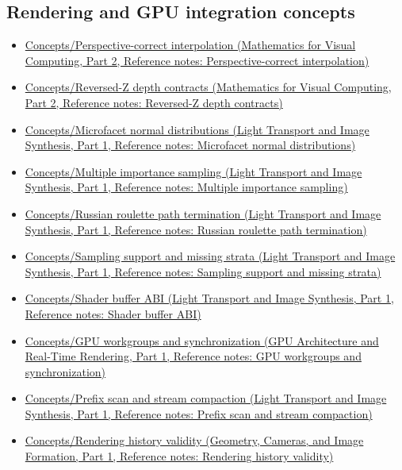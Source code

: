 \subsection{Rendering and GPU integration concepts}\label{appendix-a6d556a4ef50-rendering-and-gpu-integration-concepts}

\hypertarget{appendix-a6d556a4ef50-rendering-and-gpu-integration-concepts}{}

\begin{itemize}
\tightlist
\item
  \href{../02-Mathematics-for-Visual-Computing-P02/main.pdf\#nameddest=appendix-1ed5f96c73ea}{Concepts/Perspective-correct interpolation (Mathematics for Visual Computing, Part 2, Reference notes: Perspective-correct interpolation)}
\item
  \href{../02-Mathematics-for-Visual-Computing-P02/main.pdf\#nameddest=appendix-275ec8847057}{Concepts/Reversed-Z depth contracts (Mathematics for Visual Computing, Part 2, Reference notes: Reversed-Z depth contracts)}
\item
  \href{../04-Light-Transport-and-Image-Synthesis-P01/main.pdf\#nameddest=appendix-885c1cb64ae9}{Concepts/Microfacet normal distributions (Light Transport and Image Synthesis, Part 1, Reference notes: Microfacet normal distributions)}
\item
  \href{../04-Light-Transport-and-Image-Synthesis-P01/main.pdf\#nameddest=appendix-ca8898faf1a6}{Concepts/Multiple importance sampling (Light Transport and Image Synthesis, Part 1, Reference notes: Multiple importance sampling)}
\item
  \href{../04-Light-Transport-and-Image-Synthesis-P01/main.pdf\#nameddest=appendix-7277c62d4599}{Concepts/Russian roulette path termination (Light Transport and Image Synthesis, Part 1, Reference notes: Russian roulette path termination)}
\item
  \href{../04-Light-Transport-and-Image-Synthesis-P01/main.pdf\#nameddest=appendix-10308c3d753e}{Concepts/Sampling support and missing strata (Light Transport and Image Synthesis, Part 1, Reference notes: Sampling support and missing strata)}
\item
  \href{../04-Light-Transport-and-Image-Synthesis-P01/main.pdf\#nameddest=appendix-749048795dbb}{Concepts/Shader buffer ABI (Light Transport and Image Synthesis, Part 1, Reference notes: Shader buffer ABI)}
\item
  \href{../06-GPU-Architecture-and-Real-Time-Rendering-P01/main.pdf\#nameddest=appendix-f662b5b1773b}{Concepts/GPU workgroups and synchronization (GPU Architecture and Real-Time Rendering, Part 1, Reference notes: GPU workgroups and synchronization)}
\item
  \href{../04-Light-Transport-and-Image-Synthesis-P01/main.pdf\#nameddest=appendix-f2ee4d086415}{Concepts/Prefix scan and stream compaction (Light Transport and Image Synthesis, Part 1, Reference notes: Prefix scan and stream compaction)}
\item
  \href{../03-Geometry-Cameras-and-Image-Formation-P01/main.pdf\#nameddest=appendix-2e7e9fd28a2c}{Concepts/Rendering history validity (Geometry, Cameras, and Image Formation, Part 1, Reference notes: Rendering history validity)}
\end{itemize}

